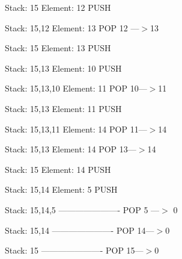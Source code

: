 \documentclass[letterpaper,portrait,12pt]{article}
\begin{document}
\begin{flushleft}
Stack: 15		Element: 12		PUSH
\end{flushleft}


\begin{flushleft}
Stack: 15,12		Element: 13		POP		12 ---$>$13
\end{flushleft}


\begin{flushleft}
Stack: 15		Element: 13		PUSH
\end{flushleft}


\begin{flushleft}
Stack: 15,13		Element: 10		PUSH
\end{flushleft}


\begin{flushleft}
Stack: 15,13,10	Element: 11		POP 		10---$>$11
\end{flushleft}


\begin{flushleft}
Stack: 15,13		Element: 11		PUSH
\end{flushleft}


\begin{flushleft}
Stack: 15,13,11	Element: 14		POP		11---$>$14
\end{flushleft}


\begin{flushleft}
Stack: 15,13		Element: 14		POP		13---$>$14
\end{flushleft}


\begin{flushleft}
Stack: 15		Element: 14		PUSH
\end{flushleft}


\begin{flushleft}
Stack: 15,14		Element: 5		PUSH		
\end{flushleft}


\begin{flushleft}
Stack: 15,14,5 	----------------------	POP		 5 ---$>$ 0
\end{flushleft}


\begin{flushleft}
Stack: 15,14	 	----------------------	POP		14---$>$0
\end{flushleft}


\begin{flushleft}
Stack: 15	 	----------------------	POP		15---$>$0
\end{flushleft}


\begin{flushleft}
\newpage
	
\end{flushleft}
\end{document}
